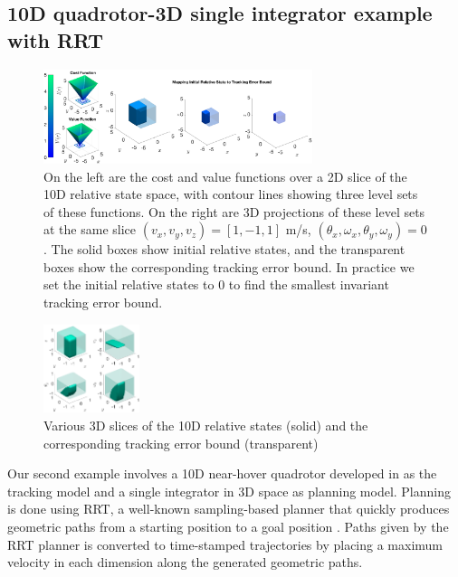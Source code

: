 \subsection{10D quadrotor-3D single integrator example with RRT\label{sec:resultsRRT}}


\begin{figure}
	\centering
	\includegraphics[width=0.7\textwidth]{fig/quad10D_example_cost}
	\caption{On the left are the cost and value functions over a 2D slice of the 10D relative state space, with contour lines showing three level sets of these functions. On the right are 3D projections of these level sets at the same slice $(v_{x},v_{y},v_{z})=[1, -1, 1]$ m/s, $(\theta_{x},\omega_{x},\theta_{y},\omega_{y})=0$. The solid boxes show initial relative states, and the transparent boxes show the corresponding tracking error bound. In practice we set the initial relative states to 0 to find the smallest invariant tracking error bound.}
	\label{fig:quad10D_example}
	\end{figure} 
\begin{figure}
	\centering
	\includegraphics[width=0.25\textwidth]{fig/quad10D_slices}
	\caption{Various 3D slices of the 10D relative states (solid) and the corresponding tracking error bound (transparent)}
	\label{fig:quad10D_example_slices}
\end{figure} 

Our second example involves a 10D near-hover quadrotor developed in \cite{Bouffard12} as the tracking model and a single integrator in 3D space as planning model.
Planning is done using RRT, a well-known sampling-based planner that quickly produces geometric paths from a starting position to a goal position \cite{Kuffner2000,Kavraki1996}.
Paths given by the RRT planner is converted to time-stamped trajectories by placing a maximum velocity in each dimension along the generated geometric paths.

